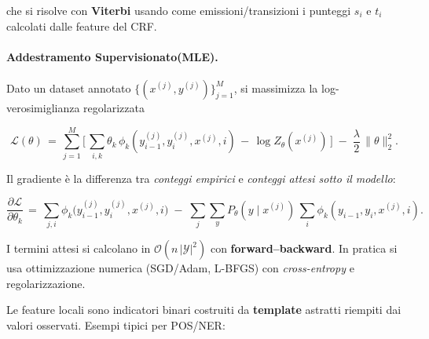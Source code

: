                 che si risolve con \textbf{Viterbi} usando come emissioni/transizioni i punteggi $s_i$ e $t_i$ calcolati dalle feature del CRF.
                
                \paragraph{Addestramento Supervisionato(MLE).}
                Dato un dataset annotato $\{(x^{(j)},y^{(j)})\}_{j=1}^M$, si massimizza la log-verosimiglianza regolarizzata
                
                $$
                    \mathcal{L}(\theta) \,=\, \sum_{j=1}^{M} \Big[\, \sum_{i,k} \theta_k\,\phi_k(y^{(j)}_{i-1},y^{(j)}_{i},x^{(j)},i) \,-\, \log Z_\theta(x^{(j)}) \,\Big] \; - \; \frac{\lambda}{2}\,\lVert\theta\rVert_2^2.
                $$
                
                Il gradiente è la differenza tra \emph{conteggi empirici} e \emph{conteggi attesi sotto il modello}:
                
                $$
                    \frac{\partial \mathcal{L}}{\partial \theta_k} \,=\, \sum_{j,i} \phi_k\big(y^{(j)}_{i-1},y^{(j)}_{i},x^{(j)},i\big) \; - \; \sum_{j} \sum_{y} P_\theta(y\mid x^{(j)})\, \sum_{i} \phi_k(y_{i-1},y_i,x^{(j)},i).
                $$
                
                I termini attesi si calcolano in $\mathcal{O}(n\,|\mathcal{Y}|^2)$ con \textbf{forward–backward}. In pratica si usa ottimizzazione numerica (SGD/Adam, L-BFGS) con \emph{cross-entropy} e regolarizzazione.

                \newpage
                
                Le feature locali sono indicatori binari costruiti da \textbf{template} astratti riempiti dai valori osservati. Esempi tipici per POS/NER:
                
